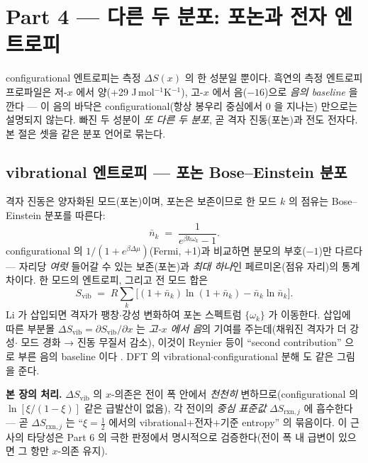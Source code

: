 \documentclass[11pt,a4paper]{article}
\newcommand{\rxn}{\mathrm{rxn}}
\newcommand{\vib}{\mathrm{vib}}
\begin{document}
\section*{Part 4 — 다른 두 분포: 포논과 전자 엔트로피}

configurational 엔트로피는 측정 $\Delta S(x)$ 의 한 성분일 뿐이다. 흑연의 측정 엔트로피 프로파일은
저-$x$ 에서 양(+29 J\,mol$^{-1}$K$^{-1}$), 고-$x$ 에서 음($-16$)으로 \emph{음의 baseline} 을 깐다
\cite{reynier2003,allart2018} — 이 음의 바닥은 configurational(항상 봉우리 중심에서 0 을 지나는) 만으로는
설명되지 않는다. 빠진 두 성분이 \emph{또 다른 두 분포}, 곧 격자 진동(포논)과 전도 전자다. 본 절은 셋을
같은 분포 언어로 묶는다.

\subsection{vibrational 엔트로피 — 포논 Bose--Einstein 분포}\label{sec:svib}
격자 진동은 양자화된 모드(포논)이며, 포논은 보존이므로 한 모드 $k$ 의 점유는 Bose--Einstein 분포를 따른다:
\begin{equation}
\bar n_k \;=\; \frac{1}{e^{\beta\hbar\omega_k}-1}.
\label{eq:BE}
\end{equation}
configurational 의 $1/(1+e^{\beta\Delta\mu})$(Fermi, +1)과 비교하면 분모의 부호($-1$)만 다르다 — 자리당
\emph{여럿} 들어갈 수 있는 보존(포논)과 \emph{최대 하나}인 페르미온(점유 자리)의 통계 차이다. 한 모드의
엔트로피, 그리고 전 모드 합은 \cite{pathria,jpcc2021}
\begin{equation}
S_\vib \;=\; R\sum_k\Big[(1+\bar n_k)\ln(1+\bar n_k)-\bar n_k\ln\bar n_k\Big].
\label{eq:svib}
\end{equation}
Li 가 삽입되면 격자가 팽창$\cdot$강성 변화하여 포논 스펙트럼 $\{\omega_k\}$ 가 이동한다. 삽입에 따른 부분몰
$\Delta S_\vib=\partial S_\vib/\partial x$ 는 \emph{고-$x$ 에서 음}의 기여를 주는데(채워진 격자가 더 강성$\cdot$
모드 경화 → 진동 무질서 감소), 이것이 Reynier 등이 ``second contribution'' 으로 부른 음의 baseline 이다
\cite{reynier2003}. DFT 의 vibrational$\cdot$configurational 분해 \cite{jpcc2021} 도 같은 그림을 준다.

\textbf{본 장의 처리.} $\Delta S_\vib$ 의 $x$-의존은 전이 폭 안에서 \emph{천천히} 변하므로(configurational 의
$\ln[\xi/(1-\xi)]$ 같은 급발산이 없음), 각 전이의 \emph{중심 표준값} $\Delta S_{\rxn,j}$ 에 흡수한다 —
곧 $\Delta S_{\rxn,j}$ 는 ``$\xi=\tfrac12$ 에서의 vibrational$+$전자$+$기준 entropy'' 의 묶음이다. 이
근사의 타당성은 Part 6 의 극한 판정에서 명시적으로 검증한다(전이 폭 내 급변이 있으면 그 항만 $x$-의존
유지).
\end{document}
